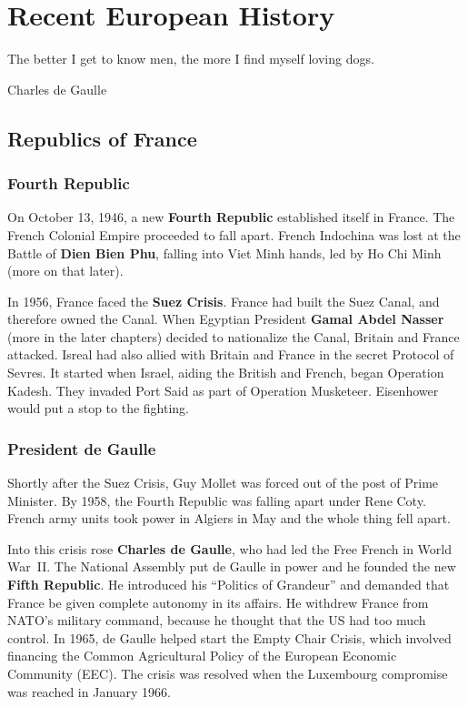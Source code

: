 \chapter{Recent European History}

\epigraph{%
  The better I get to know men, the more I find myself loving dogs.
}{Charles de Gaulle}

\section{Republics of France}

\subsection*{Fourth Republic}

On October 13, 1946, a new \textbf{Fourth Republic} established itself in France.
The French Colonial Empire proceeded to fall apart.
French Indochina was lost at the Battle of \textbf{Dien Bien Phu},
falling into Viet Minh hands, led by Ho Chi Minh (more on that later).

In 1956, France faced the \textbf{Suez Crisis}.
France had built the Suez Canal, and therefore owned the Canal.
When Egyptian President \textbf{Gamal Abdel Nasser} (more in the later chapters)
decided to nationalize the Canal, Britain and France attacked.
Isreal had also allied with Britain and France in the secret Protocol of Sevres.
It started when Israel, aiding the British and French, began Operation Kadesh.
They invaded Port Said as part of Operation Musketeer.
Eisenhower would put a stop to the fighting.

\subsection*{President de Gaulle}

Shortly after the Suez Crisis, Guy Mollet was forced out of the post of Prime Minister.
By 1958, the Fourth Republic was falling apart under Rene Coty.
French army units took power in Algiers in May and the whole thing fell apart.

Into this crisis rose \textbf{Charles de Gaulle}, who had led the Free French in World War~II\@.
The National Assembly put de Gaulle in power and he founded the new \textbf{Fifth Republic}.
He introduced his ``Politics of Grandeur'' and demanded that France be given complete autonomy in its affairs.
He withdrew France from NATO's military command, because he thought that the US had too much control.
In 1965, de Gaulle helped start the Empty Chair Crisis,
which involved financing the Common Agricultural Policy of the European Economic Community (EEC).
The crisis was resolved when the Luxembourg compromise was reached in January 1966.

